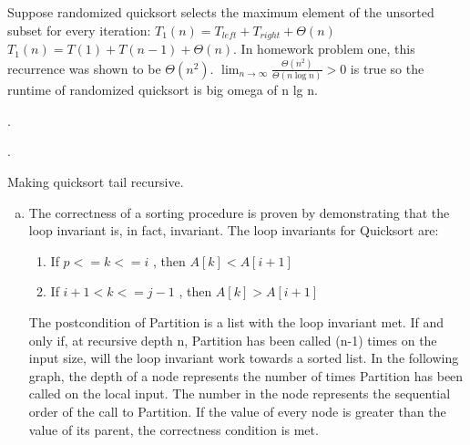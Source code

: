 \documentclass[12pt]{article}
\begin{document}
Suppose randomized quicksort selects the maximum element of the unsorted subset for every iteration: $T_{1}(n) = T_{left} + T_{right} + \Theta(n) $ $T_{1}(n) = T(1) + T(n-1) + \Theta(n) $. In homework problem one, this recurrence was shown to be $\Theta(n^2)$. $\lim_{n \to \infty} \frac{\Theta(n^2)}{\Theta(n \log n)} > 0 $ is true so the runtime of randomized quicksort is big omega of n lg n.

\vspace{10mm}
\noindent {}.

\vspace{10mm}
\noindent {}.

Making quicksort tail recursive.
\begin{enumerate}[(a)]
\smallskip
\item The correctness of a sorting procedure is proven by demonstrating that the loop invariant is, in fact, invariant. The loop invariants for Quicksort are: 
\begin{enumerate}[I]
    \item If $ p <= k <= i$ , then $A[k] < A[i+1]$
    \item If $ i + 1 < k <= j - 1 $ , then $A[k] > A[i+1]$
\end{enumerate}

The postcondition of Partition is a list with the loop invariant met. If and only if, at recursive depth n, Partition has been called (n-1) times on the input size, will the loop invariant work towards a sorted list. In the following graph, the depth of a node represents the number of times Partition has been called
on the local input. The number in the node represents the sequential order of the call to Partition. If the value of every node is greater than the value of its parent, the correctness condition is met.



\end{enumerate}
\end{document}
